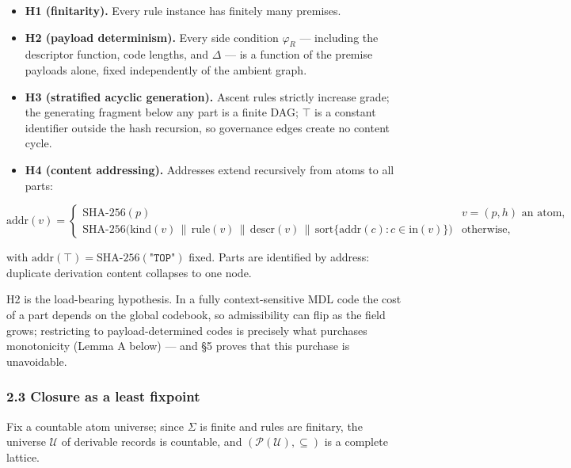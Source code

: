 \documentclass[
  10pt,
]{article}
\providecommand{\tightlist}{%
  \setlength{\itemsep}{0pt}\setlength{\parskip}{0pt}}
\begin{document}
\begin{itemize}
\tightlist
\item
  \textbf{H1 (finitarity).} Every rule instance has finitely many
  premises.
\item
  \textbf{H2 (payload determinism).} Every side condition \(\varphi_R\)
  --- including the descriptor function, code lengths, and \(\Delta\)
  --- is a function of the premise payloads alone, fixed independently
  of the ambient graph.
\item
  \textbf{H3 (stratified acyclic generation).} Ascent rules strictly
  increase grade; the generating fragment below any part is a finite
  DAG; \(\top\) is a constant identifier outside the hash recursion, so
  governance edges create no content cycle.
\item
  \textbf{H4 (content addressing).} Addresses extend recursively from
  atoms to all parts:
\end{itemize}

\[\mathrm{addr}(v) = \begin{cases} \mathrm{SHA\text{-}256}(p) & v = (p,h) \text{ an atom},\\[2pt] \mathrm{SHA\text{-}256}\big(\mathrm{kind}(v) \,\|\, \mathrm{rule}(v) \,\|\, \mathrm{descr}(v) \,\|\, \mathrm{sort}\{\mathrm{addr}(c) : c \in \mathrm{in}(v)\}\big) & \text{otherwise,} \end{cases}\]

with \(\mathrm{addr}(\top) = \mathrm{SHA\text{-}256}(\texttt{"TOP"})\)
fixed. Parts are identified by address: duplicate derivation content
collapses to one node.

H2 is the load-bearing hypothesis. In a fully context-sensitive MDL code
the cost of a part depends on the global codebook, so admissibility can
flip as the field grows; restricting to payload-determined codes is
precisely what purchases monotonicity (Lemma A below) --- and §5 proves
that this purchase is unavoidable.

\hypertarget{closure-as-a-least-fixpoint}{%
\subsubsection{2.3 Closure as a least
fixpoint}\label{closure-as-a-least-fixpoint}}

Fix a countable atom universe; since \(\Sigma\) is finite and rules are
finitary, the universe \(\mathcal{U}\) of derivable records is
countable, and \((\mathcal{P}(\mathcal{U}), \subseteq)\) is a complete
lattice.
\end{document}
